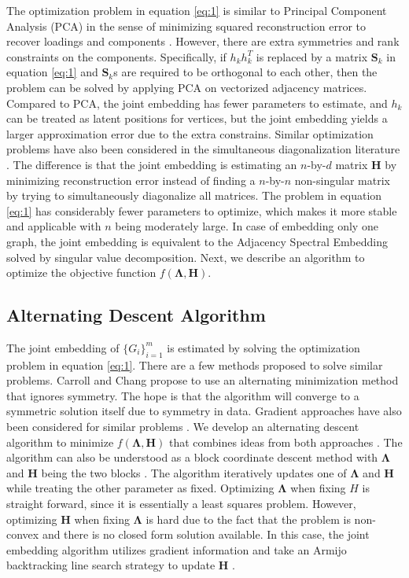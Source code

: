 \documentclass[10pt,journal,compsoc]{IEEEtran}
\newcommand{\bH}{\mathbf{H}}
\newcommand{\bS}{\mathbf{S}}
\newcommand{\bLambda}{\mathbf{\Lambda}}
\begin{document}
\noindent The optimization problem in equation \eqref{eq:1} is similar to Principal Component Analysis (PCA) in the sense of minimizing squared reconstruction error to recover loadings and components \cite{jolliffe2002principal}. However, there are extra symmetries and rank constraints on the components. Specifically, if $h_k h_k^T$ is replaced by a matrix $\bS_k$ in equation \eqref{eq:1} and $\bS_k$s are required to be orthogonal to each other, then the problem can be solved by applying PCA on vectorized adjacency matrices. Compared to PCA, the joint embedding has fewer parameters to estimate, and $h_k$ can be treated as latent positions for vertices, but the joint embedding yields a larger approximation error due to the extra constrains. Similar optimization problems have also been considered in the simultaneous diagonalization literature \cite{flury1986algorithm,ziehe2004fast}. The difference is that the joint embedding is estimating an $n$-by-$d$ matrix $\bH$ by minimizing reconstruction error instead of finding a $n$-by-$n$ non-singular matrix by trying to simultaneously diagonalize all matrices. The problem in equation \eqref{eq:1} has considerably fewer parameters to optimize, which makes it more stable and applicable with $n$ being moderately large. In case of embedding only one graph, the joint embedding is equivalent to the Adjacency Spectral Embedding solved by singular value decomposition\cite{sussman2012consistent}. Next, we describe an algorithm to optimize the objective function $f(\bLambda,\bH)$.  

\subsection{Alternating Descent Algorithm}
\noindent The joint embedding of $\{G_i \} _{i=1}^{m}$ is estimated by solving the optimization problem in equation \eqref{eq:1}. There are a few methods proposed to solve similar problems. Carroll and Chang \cite{carroll1970analysis} propose to use an alternating minimization method that ignores symmetry. The hope is that the algorithm will converge to a symmetric solution itself due to symmetry in data. Gradient approaches have also been considered for similar problems \cite{tang2009clustering, kolda2015numerical}. We develop an alternating descent algorithm to minimize $f(\bLambda,\bH)$ that combines ideas from both approaches \cite{bezdek2003convergence}. The algorithm can also be understood as a block coordinate descent method with $\bLambda$ and $\bH$ being the two blocks \cite{wright2015coordinate,beck2013convergence}. The algorithm iteratively updates one of $\bLambda$ and $\bH$ while treating the other parameter as fixed. Optimizing $\bLambda$ when fixing $H$ is straight forward, since it is essentially a least squares problem. However, optimizing $\bH$ when fixing $\bLambda$ is hard due to the fact that the problem is non-convex and there is no closed form solution available. In this case, the joint embedding algorithm utilizes gradient information and take an Armijo backtracking line search strategy to update $\bH$  \cite{nocedal2006numerical}. \\
\end{document}
